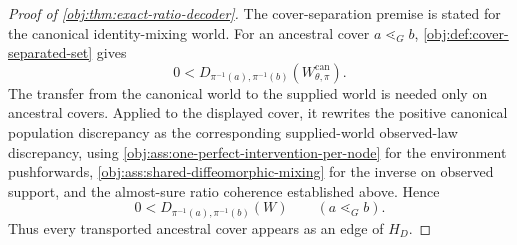 \begin{proof}[Proof of \cref{obj:thm:exact-ratio-decoder}]
The cover-separation premise is stated for the canonical identity-mixing world. For an ancestral cover \(a\lessdot_G b\), \cref{obj:def:cover-separated-set} gives
\[
0<
D_{\pi^{-1}(a),\pi^{-1}(b)}(W_{\theta,\pi}^{\mathrm{can}}).
\]
The transfer from the canonical world to the supplied world is needed only on ancestral covers. Applied to the displayed cover, it rewrites the positive canonical population discrepancy as the corresponding supplied-world observed-law discrepancy, using \cref{obj:ass:one-perfect-intervention-per-node} for the environment pushforwards, \cref{obj:ass:shared-diffeomorphic-mixing} for the inverse on observed support, and the almost-sure ratio coherence established above. Hence
\begin{equation}
0<
D_{\pi^{-1}(a),\pi^{-1}(b)}(W)
\qquad(a\lessdot_G b).
\label{eq:exact-ratio-decoder-cover-positive}
\end{equation}
Thus every transported ancestral cover appears as an edge of \(H_D\). %


\end{proof}
